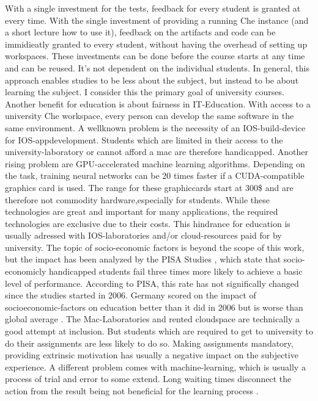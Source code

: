 \documentclass[utf8]{lni}
\begin{document}
With a single investment for the tests, feedback for every student is granted at every time. 
With the single investment of providing a running Che instance (and a short lecture how to use it), feedback on the artifacts and code can be immidieatly granted to every student, without having the overhead of setting up workspaces. 
These investments can be done before the course starts at any time and can be reused.
It's not dependent on the individual students. 
In general, this approach enables studies to be less about the subject, but instead to be about learning the subject. 
I consider this the primary goal of university courses. 
Another benefit for education is about fairness in IT-Education.  
With access to a university Che workspace, every person can develop the same software in the same environment. 
A wellknown problem is the necessity of an IOS-build-device for IOS-appdevelopment.
Students which are limited in their access to the university-laboratory or cannot afford a mac are therefore handicapped.
Another  rising  problem  are  GPU-accelerated  machine learning algorithms. 
Depending on the task, training neural networks can be 20 times faster if a CUDA-compatible graphics card is used. 
The range for these graphiccards start at 300\$ and are therefore not commodity hardware,especially for students.  
While these technologies are great and important for many applications, the required technologies are exclusive due to  their  costs.
This  hindrance  for  education  is  usually adressed  with  IOS-laboratories  and/or  cloud-resources paid for by university. 
The topic of socio-economic factors is beyond the scope of this work, but the impact has been analyzed by the PISA Studies \cite{PISA15}, which state that socio-economicly handicapped students fail three times more likely to achieve a basic level of performance.
According to PISA, this rate has not significally changed since the studies started in 2006. 
Germany scored on the impact of socioeconomic-factors on education better than it did in 2006 but is worse than global average \cite{OECDCN15}.
The Mac-Laboratories and rented cloudspace are technically a good attempt at inclusion. 
But students which are required to get to university to do their assignments are 
less  likely  to  do  so.
Making  assignments  mandatory, providing extrinsic motivation \cite{DECI93} has usually a negative impact on the subjective experience.
A different problem comes with machine-learning, which is usually a process of trial and error to some extend.
Long waiting times disconnect the action from the result being not beneficial for the learning process \cite{HU95}\cite{DECI93}. 
\end{document}
